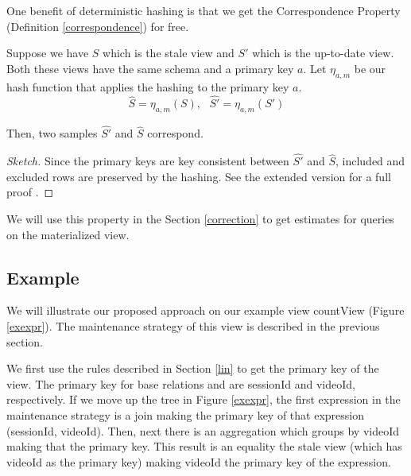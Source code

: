One benefit of deterministic hashing is that we get the Correspondence Property (Definition \ref{correspondence}) for free.
\begin{theorem}
Suppose we have $S$ which is the stale view and $S'$ which is the up-to-date view.
Both these views have the same schema and a primary key $a$.
Let $\eta_{a, m}$ be our hash function that applies the hashing to the primary key $a$.
\[
\hat{S} = \eta_{a, m}(S),\text{ } \hat{S'} = \eta_{a, m}(S')
\]

Then, two samples $\hat{S'}$ and $\hat{S}$ correspond.
\end{theorem}
\begin{proof}[Sketch]
Since the primary keys are key consistent between $\hat{S'}$ and $\hat{S}$, included and excluded rows are preserved by the hashing.
See the extended version for a full proof \cite{technicalReport}.

\end{proof}
We will use this property in the Section \ref{correction} to get estimates for queries on the materialized view.

\subsection{Example}
We will illustrate our proposed approach on our example view \textsf{countView} (Figure \ref{exexpr}).
The maintenance strategy of this view is described in the previous section.

We first use the rules described in Section \ref{lin} to get the primary key of the view.  
The primary key for base relations  and  are \textsf{sessionId} and \textsf{videoId}, respectively.
If we move up the tree in Figure \ref{exexpr}, the first expression in the maintenance strategy is a join making the primary key of that expression (\textsf{sessionId}, \textsf{videoId}).
Then, next there is an aggregation which groups by \textsf{videoId} making that the primary key.
This result is an equality the stale view (which has \textsf{videoId} as the primary key) making \textsf{videoId} the primary key of the expression.

